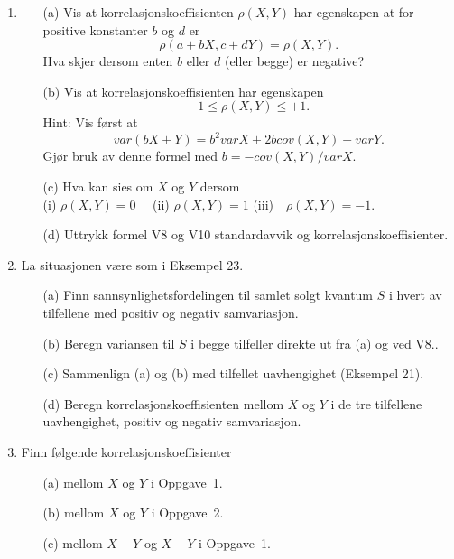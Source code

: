 \begin{enumerate}
\item  \begin{itemize}
      \item[(a)]  Vis at korrelasjonskoeffisienten $\rho (X,Y)$
          har egenskapen at for positive konstanter $b$ og $d$ er
          \[ \rho (a+bX, c+dY)=\rho (X,Y). \]
          Hva skjer dersom enten $b$ eller $d$ (eller begge) er negative? 
      \item[(b)]  Vis at korrelasjonskoeffisienten har egenskapen
          \[ -1\leq \rho (X,Y)\leq +1. \]
          Hint: Vis først at
          \[  var(bX+Y)=b^2varX+2b cov(X,Y)+varY. \]
          Gjør bruk av denne formel med $b=-cov(X,Y)/varX$.
      \item[(c)]  Hva kan sies om $X$ og $Y$ dersom \\
        (i)  $\rho (X,Y)=0$ \ \ (ii) $\rho (X,Y)=1$  (iii)\ \ $\rho (X,Y)=-1$.
        \item[(d)] Uttrykk formel V8 og V10 standardavvik og 
                   korrelasjonskoeffisienter.
     \end{itemize}

\item La situasjonen være som i Eksempel 23.
     \begin{itemize}
     \item[(a)]  Finn sannsynlighetsfordelingen til samlet solgt kvantum
          $S$ i hvert av tilfellene med positiv og negativ
        samvariasjon.
     \item[(b)]  Beregn variansen til $S$ i begge tilfeller direkte ut
          fra (a) og ved V8..
     \item[(c)]  Sammenlign (a) og (b) med tilfellet
          uavhengighet (Eksempel 21).
     \item[(d)]  Beregn korrelasjonskoeffisienten mellom $X$ og $Y$ i de
          tre tilfellene uavhengighet, positiv og negativ samvariasjon.
     \end{itemize}  

\item Finn følgende korrelasjonskoeffisienter
     \begin{itemize}
     \item[(a)]  mellom $X$ og $Y$ i Oppgave~1.
     \item[(b)]  mellom $X$ og $Y$ i Oppgave~2.
     \item[(c)]  mellom $X+Y$ og $X-Y$ i Oppgave~1.
     \end{itemize}  


\end{enumerate}
